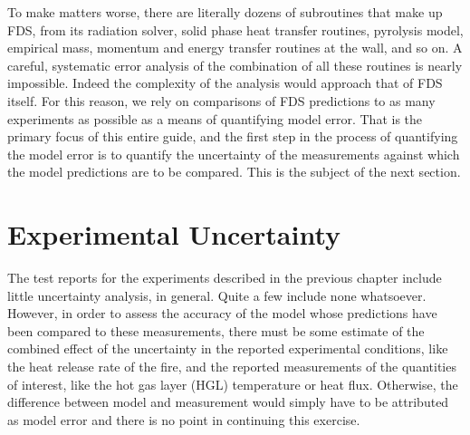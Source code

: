 To make matters worse, there are literally dozens of subroutines that make up FDS, from its radiation solver, solid phase heat transfer routines, pyrolysis model,
empirical mass, momentum and energy transfer routines at the wall, and so on. A careful, systematic error analysis of the combination of all these routines is
nearly impossible. Indeed the complexity of the analysis would approach that of FDS itself. For this reason, we rely on comparisons of FDS predictions to as many
experiments as possible as a means of quantifying model error. That is the primary focus of this entire guide, and the first step in the process of quantifying the
model error is to quantify the uncertainty of the measurements against which the model predictions are to be compared. This is the subject of the next section.


\section{Experimental Uncertainty}

The test reports for the experiments described in the previous chapter include little uncertainty analysis, in general. Quite a
few include none whatsoever.
However, in order to assess the accuracy of the model whose predictions have been compared to these measurements, there must be some estimate of the
combined effect of the uncertainty in the reported experimental conditions, like the heat release rate of the fire,
and the reported measurements of the quantities of interest, like the hot gas layer (HGL)
temperature or heat flux. Otherwise, the difference between model and measurement would simply have to be attributed as model error and there is no point in
continuing this exercise.

